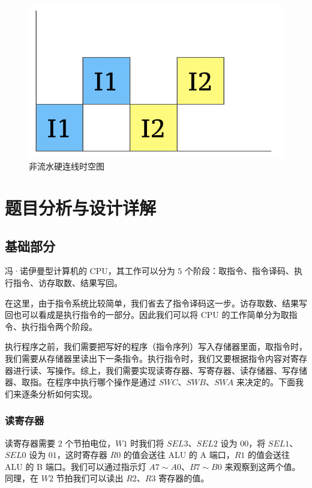 \documentclass[12pt]{article}
\begin{document}
{            \begin{figure}
                \centering
                \includegraphics[width=1.0\textwidth]{非流水.png}
                \caption{非流水硬连线时空图}
                \label{fig:4-3-2}
            \end{figure}
    
\section{题目分析与设计详解}
    \subsection{基础部分}
        冯·诺伊曼型计算机的 CPU，其工作可以分为 $5$ 个阶段：取指令、指令译码、执行指令、访存取数、结果写回。
        
        在这里，由于指令系统比较简单，我们省去了指令译码这一步。访存取数、结果写回也可以看成是执行指令的一部分。因此我们可以将 CPU 的工作简单分为取指令、执行指令两个阶段。
        
        执行程序之前，我们需要把写好的程序（指令序列）写入存储器里面，取指令时，我们需要从存储器里读出下一条指令。执行指令时，我们又要根据指令内容对寄存器进行读、写操作。综上，我们需要实现读寄存器、写寄存器、读存储器、写存储器、取指。在程序中执行哪个操作是通过 $SWC$、$SWB$、$SWA$ 来决定的。下面我们来逐条分析如何实现。
        
        \subsubsection{读寄存器}
            读寄存器需要 $2$ 个节拍电位，$W1$ 时我们将 $SEL3$、$SEL2$ 设为 $00$，将 $SEL1$、$SEL0$ 设为 $01$，这时寄存器 $R0$ 的值会送往 ALU 的 A 端口，$R1$ 的值会送往 ALU 的 B 端口。我们可以通过指示灯 $A7\sim A0$、$B7\sim B0$ 来观察到这两个值。同理，在 $W2$ 节拍我们可以读出 $R2$、$R3$ 寄存器的值。
        
}
\end{document}

